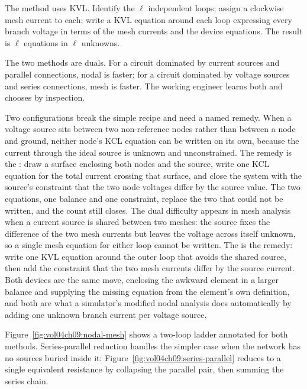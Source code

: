 The  method uses KVL. Identify the $\ell$
independent loops; assign a clockwise mesh current to each; write a
KVL equation around each loop expressing every branch voltage in
terms of the mesh currents and the device equations. The result is
$\ell$ equations in $\ell$ unknowns.

The two methods are duals. For a circuit dominated by current sources
and parallel connections, nodal is faster; for a circuit dominated by
voltage sources and series connections, mesh is faster. The working
engineer learns both and chooses by inspection.

Two configurations break the simple recipe and need a named remedy. When a
voltage source sits between two non-reference nodes rather than between a node
and ground, neither node's KCL equation can be written on its own, because the
current through the ideal source is unknown and unconstrained. The remedy is the
: draw a surface enclosing both nodes and the source, write
one KCL equation for the total current crossing that surface, and close the
system with the source's constraint that the two node voltages differ by the
source value. The two equations, one balance and one constraint, replace the two
that could not be written, and the count still closes. The dual difficulty
appears in mesh analysis when a current source is shared between two meshes: the
source fixes the difference of the two mesh currents but leaves the voltage
across itself unknown, so a single mesh equation for either loop cannot be
written. The  is the remedy: write one KVL equation around
the outer loop that avoids the shared source, then add the constraint that the
two mesh currents differ by the source current. Both devices are the same move,
enclosing the awkward element in a larger balance and supplying the missing
equation from the element's own definition, and both are what a simulator's
modified nodal analysis does automatically by adding one unknown branch current
per voltage source.



Figure~\ref{fig:vol04ch09:nodal-mesh} shows a two-loop ladder annotated
for both methods. Series-parallel reduction handles the simpler case
when the network has no sources buried inside it:
Figure~\ref{fig:vol04ch09:series-parallel} reduces to a single
equivalent resistance by collapsing the parallel pair, then summing the
series chain.



